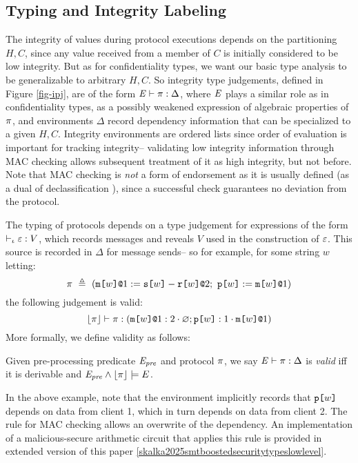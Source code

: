 \subsection{Typing and Integrity Labeling}

The integrity of values during protocol executions depends on the
partitioning $H,C$, since any value received from a member of $C$ is
initially considered to be low integrity. But as for confidentiality
types, we want our basic type analysis to be generalizable to
arbitrary $H,C$. So integrity type judgements, defined in Figure
\ref{fig-ipj}, are of the form $\mathit{E} \vdash \pi : \Delta$, where
$\mathit{E}$ plays a similar role as in confidentiality types, as a possibly
weakened expression of algebraic properties of $\pi$, and
environments $\Delta$ record dependency information that can be
specialized to a given $H,C$. Integrity environments are ordered lists
since order of evaluation is important for tracking integrity--
validating low integrity information through MAC checking allows
subsequent treatment of it as high integrity, but not before. Note
that MAC checking is \emph{not} a form of endorsement as it is usually
defined (as a dual of declassification
\cite{sabelfeld2009declassification}), since a successful check
guarantees no deviation from the protocol.

The typing of protocols depends on a type judgement for expressions
of the form $\vdash_{\iota} \varepsilon : V$, which records
messages and reveals $V$ used in the construction of $\varepsilon$.
This source is recorded in $\Delta$ for message sends-- so for
example, for some string $w$ letting:
$$
\prog\ \defeq\ (\xassign{\mx{w}{1}}{\secret{w} - \flip{w}}{2};\ \rvl{w} := \mx{w}{1})
$$
the following judgement is valid:
$$
\lfloor \pi \rfloor \vdash \pi : (\texttt{m[}w\texttt{]}\texttt{@}1 : 2 \cdot \varnothing; \texttt{p[}w\texttt{]} : 1 \cdot \texttt{m[}w\texttt{]}\texttt{@}1)
$$
More formally, we define validity as follows:
\begin{definition}
  Given pre-processing predicate $\mathit{E}_{\mathit{pre}}$ and protocol $\pi$, 
  we say $\mathit{E} \vdash \pi : \Delta$ is \emph{valid}
  iff it is derivable and $\mathit{E}_{\mathit{pre}} \wedge \lfloor \pi \rfloor \models E$.
\end{definition}

In the above example, note that the environment implicitly records
that $\texttt{p[}w\texttt{]}$ depends on data from client 1, which in turn
depends on data from client 2. The rule for MAC
checking allows an overwrite of the dependency. An implementation
of a malicious-secure arithmetic circuit that
applies this rule is provided in extended version of
this paper \ref{skalka2025smtboostedsecuritytypeslowlevel}.

